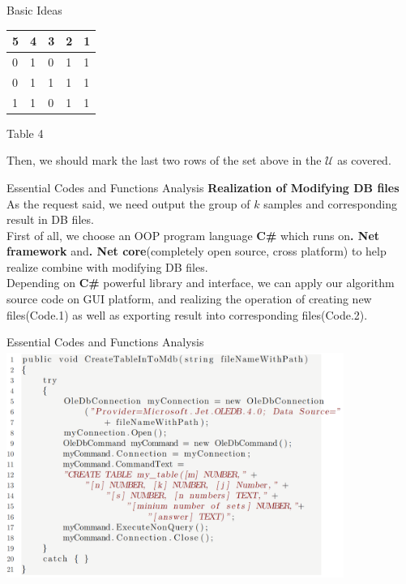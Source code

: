 \documentclass[hyperref={pdfpagelabels=false}]{beamer}
\begin{document}
\begin{frame}{Basic Ideas}
    \begin{center}
    \begin{table}[!hpbt]
        \centering
        \begin{tabular}{lllll}
        \hline
        \multicolumn{1}{|l|}{5} & \multicolumn{1}{l|}{4} & \multicolumn{1}{l|}{3} & \multicolumn{1}{l|}{2} & \multicolumn{1}{l|}{1}\\ \hline
        0& 1& 0& 1& 1\\
        0& 1& 1& 1& 1\\
        1& 1& 0& 1& 1                     
        \end{tabular}
    \end{table}
    Table 4
    \end{center}
    Then, we should mark the last two rows of the set above in the $\mathcal{U}$ as covered.
\end{frame}

\begin{frame}{Essential Codes and Functions Analysis}
    \textbf{Realization of Modifying DB files}\\
    As the request said, we need output the group of $k$ samples and corresponding result in DB files.\\
    First of all, we choose an OOP program language \textbf{C\#} which runs on\textbf{. Net framework} and\textbf{. Net core}(completely open source, cross platform) to help realize combine with modifying DB files.\\
    Depending on \textbf{C\#} powerful library and interface, we can apply our algorithm source code on GUI platform, and realizing the operation of creating new files(Code.1) as well as exporting result into corresponding files(Code.2).
\end{frame}

\begin{frame}{Essential Codes and Functions Analysis}
    \includegraphics[width=11cm,height=7.5cm]{Figures/5.PNG}
\end{frame}
\end{document}
